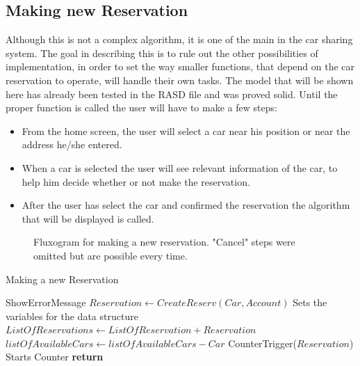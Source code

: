 \documentclass[a4paper]{article}
\begin{document}
\subsection{Making new Reservation}

Although this is not a complex algorithm, it is one of the main in the car sharing system. The goal in describing this is to rule out the other possibilities of implementation, in order to set the way smaller functions, that depend on the car reservation to operate, will handle their own tasks. The model that will be shown here has already been tested in the RASD file and was proved solid. \newline
Until the proper function is called the user will have to make a few steps:
\begin{itemize} 
\item From the home screen, the user will select a car near his position or near the address he/she entered.
\item  When a car is selected the user will see relevant information of the car, to help him decide whether or not make the reservation.
\item After the user has select the car and confirmed the reservation the algorithm that will be displayed is called.
\end{itemize}
\begin{figure}[h]
\centering
\vspace*{\fill}
\noindent{}%
\caption {Fluxogram for making a new reservation. "Cancel" steps were omitted but are possible every time.}
\vspace*{0.2cm}
\end{figure}

\begin{algorithm}
\caption{Making a new Reservation}\label{MakeReserv}
\begin{algorithmic}[1]

	\State ShowErrorMessage
\Else
\State $Reservation \leftarrow CreateReserv(Car, Account)$ \Comment Sets the variables for the data structure
\State $ListOfReservations \leftarrow ListOfReservation + Reservation$
\State $listOfAvailableCars \leftarrow listOfAvailableCars - Car$
\State CounterTrigger($Reservation$) \Comment Starts Counter
\EndIf
\State \textbf{return} 
\EndProcedure
\end{algorithmic}
\end{algorithm}
\end{document}
